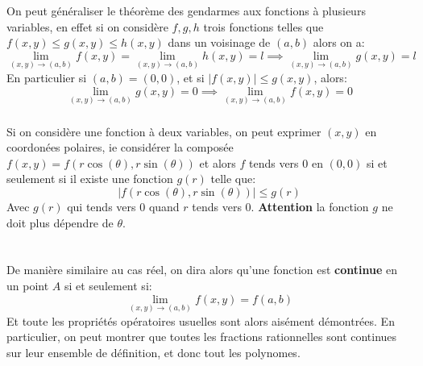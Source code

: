 \subsection*{}
On peut généraliser le théorème des gendarmes aux fonctions à plusieurs variables, en effet si on considère \(f, g, h\) trois fonctions telles que \(f(x, y) \leq g(x, y) \leq h(x, y)\) dans un voisinage de \((a, b)\) alors on a:
\[
   \lim_{(x, y) \rightarrow (a, b)} f(x, y) = \lim_{(x, y) \rightarrow (a, b)} h(x, y) = l \implies \lim_{(x, y) \rightarrow (a, b)} g(x, y) = l
\] 
En particulier si \((a, b) = (0, 0)\), et si \(|f(x, y)| \leq g(x, y)\), alors:
\[
   \lim_{(x, y) \rightarrow (a, b)} g(x, y) = 0 \implies \lim_{(x, y) \rightarrow (a, b)} f(x, y) = 0
\]

\subsection*{}
Si on considère une fonction à deux variables, on peut exprimer \((x, y)\) en coordonées polaires, ie considérer la composée \(f(x, y) = f(r\cos(\theta), r\sin(\theta))\) et alors \(f\) tends vers \(0\) en \((0, 0)\) si et seulement si il existe une fonction \(g(r)\) telle que:
\[
   |f(r\cos(\theta), r\sin(\theta))| \leq g(r)
\]
Avec \(g(r)\) qui tends vers \(0\) quand \(r\) tends vers \(0\). \textbf{Attention} la fonction \(g\) ne doit plus dépendre de \(\theta\).

\chapter*{}
De manière similaire au cas réel, on dira alors qu'une fonction est \textbf{continue} en un point \(A\) si et seulement si:
\[
   \lim_{(x, y) \rightarrow (a, b)} f(x, y) = f(a, b)   
\]
Et toute les propriétés opératoires usuelles sont alors aisément démontrées. En particulier, on peut montrer que toutes les fractions rationnelles sont continues sur leur ensemble de définition, et donc tout les polynomes.

